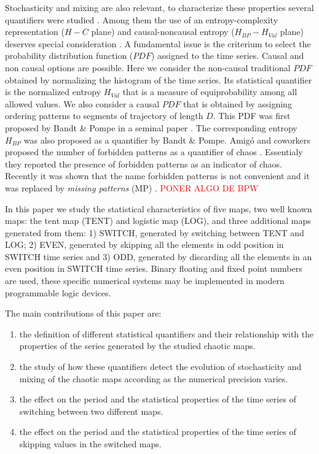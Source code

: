 Stochasticity and mixing are also relevant, to characterize these properties several quantifiers were studied \cite{DeMicco2009}.
Among them the use of an entropy-complexity representation ($H-C$ plane) and causal-noncausal entropy ($H_{BP}-H_{Val}$ plane) deserves special consideration \cite{Rosso2007,DeMicco2008,DeMicco2012,DeMicco2009,Rosso2010,Antonelli2017}.
A fundamental issue is the criterium to select the probability distribution function ($PDF$) assigned to the time series.
Causal and non causal options are possible.
Here we consider the non-causal traditional $PDF$ obtained by normalizing the histogram of the time series.
Its statistical quantifier is the normalized entropy $H_{Val}$ that is a measure of equiprobability among all allowed values.
We also consider a causal $PDF$ that is obtained by assigning ordering patterns to segments of trajectory of length $D$.
This PDF was first proposed by Bandt \& Pompe in a seminal paper \cite{Bandt2002}.
The corresponding entropy $H_{BP}$ was also proposed as a quantifier by Bandt \& Pompe.
Amig\'o and coworkers proposed the number of forbidden patterns as a quantifier of chaos \cite{Amigo2007a}.
Essentialy they reported the presence of forbidden patterns as an indicator of chaos.
Recently it was shown that the name forbidden patterns is not convenient and it was replaced by \textit{missing patterns }(MP) \cite{Rosso2012}.
\textcolor{red}{PONER ALGO DE BPW}

In this paper we study the statistical characteristics of five maps, two well known maps: the tent map (TENT) and logistic map (LOG), and three additional maps generated from them: 1) SWITCH, generated by switching between TENT and LOG; 2) EVEN, generated by skipping all the elements in odd position in SWITCH time series and 3) ODD, generated by discarding all the elements in an even position in SWITCH time series.
Binary floating and fixed point numbers are used, these specific numerical systems may be implemented in modern programmable logic devices.

The main contributions of this paper are:
\begin{enumerate}
\item the definition of different statistical quantifiers and their relationship with the properties of the series generated by the studied chaotic maps.
\item the study of how these quantifiers detect the evolution of stochasticity and mixing of the chaotic maps according as the numerical precision varies.
\item the effect on the period and the statistical properties of the time series of switching between two different maps.
\item the effect on the period and the statistical properties of the time series of skipping values in the switched maps.
\end{enumerate}

